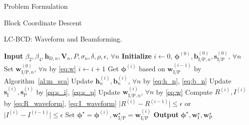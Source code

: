 \documentclass[journal]{IEEEtran}
\begin{document}
\begin{section}{Problem Formulation}
\begin{subsection}{Block Coordinate Descent}
			\begin{algorithm}[!t]
				\caption{LC-BCD: Waveform and Beamforming.}
				\label{al:lc_bcd}
				\begin{algorithmic}[1]
					\State \textbf{Input} $\beta_2,\beta_4,\boldsymbol{h}_{\mathrm{D},n},\boldsymbol{V}_{n},P,\sigma_n,\delta,\rho,\epsilon$, $\forall n$
					\State \textbf{Initialize} $i \gets 0$, $\boldsymbol{\phi}^{(0)},\boldsymbol{b}_{\mathrm{I/P},n}^{(0)},\boldsymbol{s}_{\mathrm{I/P}}^{(0)}$, $\forall n$
					\State Set $\boldsymbol{w}_{\mathrm{I/P},n}^{(0)}$, $\forall n$ by \eqref{eq:w}
					\Repeat
						\State $i \gets i + 1$
						\State Get $\boldsymbol{\phi}^{(i)}$ based on $\boldsymbol{w}_{\mathrm{I/P}}^{(i-1)}$ by Algorithm~\ref{al:m_sca}
						\State Update $\boldsymbol{h}_n^{(i)},\boldsymbol{b}_n^{(i)}$, $\forall n$ by \eqref{eq:h_n}, \eqref{eq:b_n}
						\State Update $\boldsymbol{s}_{\mathrm{I}}^{(i)},\boldsymbol{s}_{\mathrm{P}}^{(i)}$ by \eqref{eq:s_i}, \eqref{eq:s_p}
						\State Update $\boldsymbol{w}_{\mathrm{I/P},n}^{(i)}$, $\forall n$ by \eqref{eq:w}
						\State Compute $R^{(i)},I^{(i)}$ by \eqref{eq:R_waveform}, \eqref{eq:I_waveform}
					\Until $\lvert R^{(i)} - R^{(i-1)} \rvert \le \epsilon$ or $\lvert I^{(i)} - I^{(i-1)} \rvert \le \epsilon$
					\State Set $\boldsymbol{\phi}^{\star}=\boldsymbol{\phi}^{(i)},\boldsymbol{w}_{\mathrm{I/P}}^{\star}=\boldsymbol{w}_{\mathrm{I/P}}^{(i)}$
					\State \textbf{Output} $\boldsymbol{\phi}^{\star},\boldsymbol{w}_{\mathrm{I}}^{\star},\boldsymbol{w}_{\mathrm{P}}^{\star}$
				\end{algorithmic}
			\end{algorithm}
		\end{subsection}
	\end{section}
\end{document}
